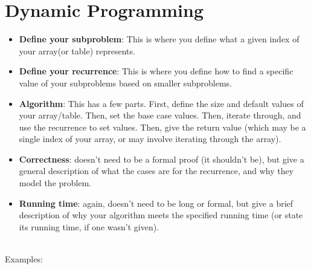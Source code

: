 \documentclass[]{article}
\begin{document}
\section{Dynamic Programming}
\begin{itemize}
    \item \textbf{Define your subproblem}: This is where you define what a given index of your array(or table) represents.
    \item \textbf{Define your recurrence}: This is where you define how to find a specific value of your subproblems based on smaller subproblems.
    \item \textbf{Algorithm}: This has a few parts. First, define the size and default values of your array/table. Then, set the base case values. Then, iterate through, and use the recurrence to set values. Then, give the return value (which may be a single index of your array, or may involve iterating through the array).
    \item \textbf{Correctness}: doesn't need to be a formal proof (it shouldn't be), but give a general description of what the cases are for the recurrence, and why they model the problem.
    \item \textbf{Running time}: again, doesn't need to be long or formal, but give a brief description of why your algorithm meets the specified running time (or state its running time, if one wasn't given).
\end{itemize}\\
Examples:
\end{document}
